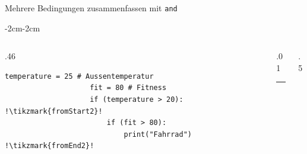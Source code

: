 \begin{frame}[fragile]{Mehrere Bedingungen zusammenfassen mit \lstinline|and|}
    \begin{adjustwidth}{-2cm}{-2cm}
        \begin{columns}
            \begin{column}{.46\pagewidth}
                \begin{lstlisting}[escapechar=!, basicstyle=\footnotesize\ttfamily]
                    temperature = 25 # Aussentemperatur
                    fit = 80 # Fitness
                    if (temperature > 20):   !\tikzmark{fromStart2}!
                        if (fit > 80):
                            print("Fahrrad") !\tikzmark{fromEnd2}!
                \end{lstlisting}
            \end{column}
            \begin{column}{.01\pagewidth}
                \rule{0.4pt}{\textheight}
            \end{column}
            \begin{column}{.5\pagewidth}
            \end{column}
        \end{columns}
    \end{adjustwidth}
\end{frame}

